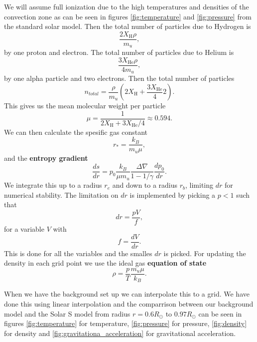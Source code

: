 We will assume full ionization due to the high temperatures and densities of the convection zone as can be seen in figures \ref{fig:temperature} and \ref{fig:pressure} from the standard solar model. Then the total number of particles due to Hydrogen is 
\begin{equation*}
    \frac{2X_\text{H}\rho}{m_u},
\end{equation*}
by one proton and electron. The total number of particles due to Helium is
\begin{equation*}
    \frac{3 X_\text{He}\rho}{4 m_u},
\end{equation*}
by one alpha particle and two electrons. Then the total number of particles
\begin{equation*}
    n_{total} = \frac{\rho}{m_u}\left( 2X_\text{H} + \frac{3 X_\text{He}}{4}{2} \right).
\end{equation*}
This gives us the mean molecular weight per particle
\begin{equation}
    \mu = \frac{1}{2X_\text{H} + 3X_\text{He}/4}\approx 0.594.
\end{equation}
We can then calculate the spesific gas constant 
    \begin{equation*}
        r_* = \frac{k_B}{m_u \mu},
    \end{equation*}
and the \textbf{entropy gradient}
    \begin{equation}\label{eq:entropy_gradient}
        \frac{ds}{dr} = p_0 \frac{k_B}{\mu m_u}\frac{\Delta\nabla}{1-1/\gamma}\frac{dp_0}{dr}.
    \end{equation}
We integrate this up to a radius $r_e$ and down to a radius $r_b$, limiting $dr$ for numerical stability. The limitation on $dr$ is implemented by picking a $p<1$ such that 
    \begin{equation*}
        dr = \frac{pV}{f},
    \end{equation*}
for a variable $V$ with
    \begin{equation*}
        f = \frac{dV}{dr}.
    \end{equation*}
This is done for all the variables and the smalles $dr$ is picked. For updating the density in each grid point we use the ideal gas \textbf{equation of state}
    \begin{equation}\label{eq:eos}
        \rho = \frac{p}{T}\frac{m_u \mu}{k_B}.
    \end{equation}

When we have the background set up we can interpolate this to a grid. We have done this using linear interpolation and the comparrison between our background model and the Solar S model from radius $r=0.6R_{\odot}$ to $0.97R_{\odot}$ can be seen in figures \ref{fig:temperature} for temperature, \ref{fig:pressure} for pressure, \ref{fig:density} for density and \ref{fig:gravitationa_acceleration} for gravitational acceleration.

